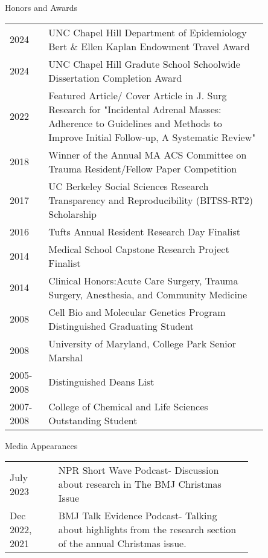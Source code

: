 \documentclass{resume} %
\begin{document}
\begin{rSection}{Honors and Awards}
   \begin{tabular}{lp{0.85\linewidth}}
   2024 & UNC Chapel Hill Department of Epidemiology Bert \& Ellen Kaplan Endowment Travel Award\\
   2024 & UNC Chapel Hill Gradute School Schoolwide Dissertation Completion Award\\
   2022 & Featured Article/ Cover Article in J. Surg Research for "Incidental Adrenal Masses: Adherence to Guidelines and Methods to Improve Initial Follow-up, A Systematic Review" \\
   2018 & Winner of the Annual MA ACS Committee on Trauma Resident/Fellow Paper Competition\\
   2017 & UC Berkeley Social Sciences Research Transparency and Reproducibility (BITSS-RT2) Scholarship \\
   2016 &Tufts Annual Resident Research Day Finalist\\
   2014 & Medical School Capstone Research Project Finalist \\
   2014 & Clinical Honors:Acute Care Surgery, Trauma Surgery, Anesthesia, and Community Medicine \\
   2008 & Cell Bio and Molecular Genetics Program Distinguished Graduating Student\\
   2008 & University of Maryland, College Park Senior Marshal \\
   2005-2008& Distinguished Deans List \\
   2007-2008 &  College of Chemical and Life Sciences Outstanding Student
\end{tabular}
   \end{rSection}

\begin{rSection}{Media Appearances}
   \begin{tabular}{lp{0.80\linewidth}}
   July 2023 & NPR Short Wave Podcast- Discussion about research in The BMJ Christmas Issue \\
   Dec 2022, 2021 & BMJ Talk Evidence Podcast- Talking about highlights from the research section of the annual Christmas issue.
\end{tabular}
   \end{rSection}
\end{document}

